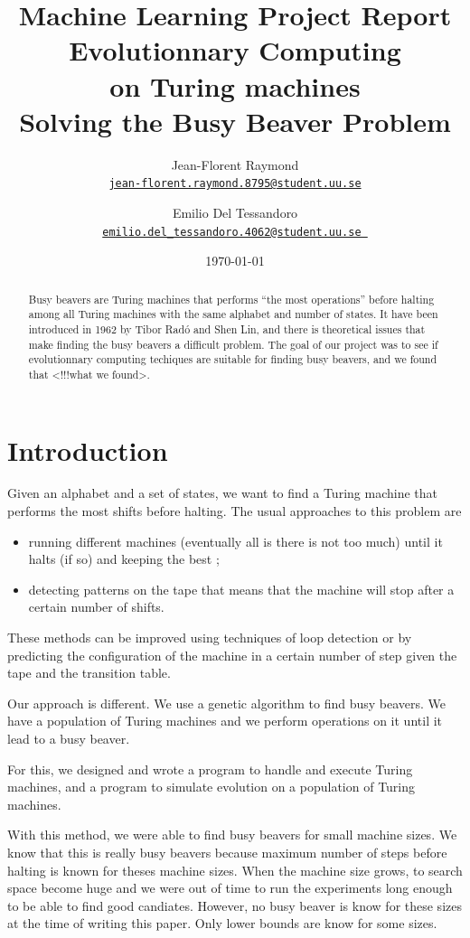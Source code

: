 \documentclass{report}
\title{Machine Learning Project Report\\\textbf{Evolutionnary Computing\\on Turing machines}\\{\Large Solving the Busy Beaver Problem}}
\author{Jean-Florent Raymond\\\href{mailto:jean-florent.raymond.8795@student.uu.se}{\texttt{jean-florent.raymond.8795@student.uu.se}} \and Emilio Del Tessandoro\\
  \href{mailto:emilio.del_tessandoro.4062@student.uu.se }{\texttt{emilio.del\_tessandoro.4062@student.uu.se }}}
\date{\today}
\begin{document}
\maketitle

\begin{abstract}

  Busy beavers are Turing machines that performs ``the most operations'' before halting among all Turing machines with the same alphabet and number of states. It have been introduced in 1962 by Tibor Radó and Shen Lin, and there is theoretical issues that make finding the busy beavers a difficult problem.
The goal of our project was to see if evolutionnary computing techiques are suitable for finding busy beavers, and we found that <!!!what we found>.

\end{abstract}

\chapter{Introduction}
\label{chap:intro}

Given an alphabet and a set of states, we want to find a Turing machine that performs the most shifts before halting. The usual approaches \cite{rado} to this problem are
\begin{itemize}
\item running different machines (eventually all is there is not too much) until it halts (if so) and keeping the best ;
\item detecting patterns on the tape that means that the machine will stop after a certain number of shifts.
\end{itemize}
These methods can be improved using techniques of loop detection or by predicting the configuration of the machine in a certain number of step given the tape and the transition table.

Our approach is different. We use a genetic algorithm to find busy beavers. We have a population of Turing machines and we perform operations on it until it lead to a busy beaver.

For this, we designed and wrote a program to handle and execute Turing machines, and a program to simulate evolution on a population of Turing machines.

With this method, we were able to find busy beavers for small machine sizes. We know that this is really busy beavers because maximum number of steps before halting is known for theses machine sizes. When the machine size grows, to search space become huge and we were out of time to run the experiments long enough to be able to find good candiates. However, no busy beaver is know for these sizes at the time of writing this paper. Only lower bounds are know for some sizes.
\end{document}
